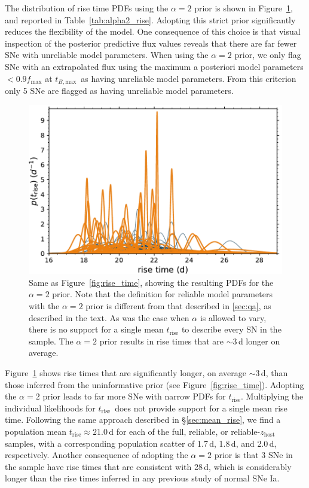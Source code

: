 \documentclass[twocolumn]{./aastex63}
\newcommand{\trise}{$t_\mathrm{rise}$}
\newcommand{\tbmax}{$t_{B,\mathrm{max}}$}
\begin{document}
The distribution of rise time PDFs using the $\alpha = 2$ prior is shown in
Figure~\ref{fig:tsquared_rise}, and reported in Table~\ref{tab:alpha2_rise}.
Adopting this strict prior significantly reduces the flexibility of the model.
One consequence of this choice is that visual inspection of the posterior
predictive flux values reveals that there are far fewer SNe with unreliable
model parameters. When using the $\alpha = 2$ prior, we only flag SNe with an
extrapolated flux using the maximum a posteriori model parameters $< 0.9
f_\mathrm{max}$ at \tbmax\ as having unreliable model parameters. From this
criterion only 5 SNe are flagged as having unreliable model parameters.



\begin{figure}
    \centering
    \includegraphics[width=1\linewidth]{./figures/tsquared_rise_time.pdf}
    \caption{Same as Figure~\ref{fig:rise_time}, showing the resulting PDFs for
    the $\alpha = 2$ prior. Note that the definition for reliable model
    parameters with the $\alpha = 2$ prior is different from that described in
    \ref{sec:qa}, as described in the text. As was the case when $\alpha$ is
    allowed to vary, there is no support for a single mean $t_\mathrm{rise}$ to
    describe every SN in the sample. The $\alpha = 2$ prior results in rise
    times that are $\sim$3\,d longer on average.}
    \label{fig:tsquared_rise}
\end{figure}

Figure~\ref{fig:tsquared_rise} shows rise times that are significantly longer,
on average $\sim$3\,d, than those inferred from the uninformative prior (see
Figure~\ref{fig:rise_time}). Adopting the $\alpha = 2$ prior leads to far more
SNe with narrow PDFs for \trise. Multiplying the individual likelihoods for
\trise\ does not provide support for a single mean rise time. Following the
same approach described in \S\ref{sec:mean_rise}, we find a population mean
\trise\;$\approx 21.0$\,d for each of the full, reliable, or
reliable-$z_\mathrm{host}$ samples, with a corresponding population scatter of
1.7\,d, 1.8\,d, and 2.0\,d, respectively. Another consequence of adopting the
$\alpha = 2$ prior is that 3 SNe in the sample have rise times that are
consistent with 28\,d, which is considerably longer than the rise times
inferred in any previous study of normal SNe Ia.
\end{document}

